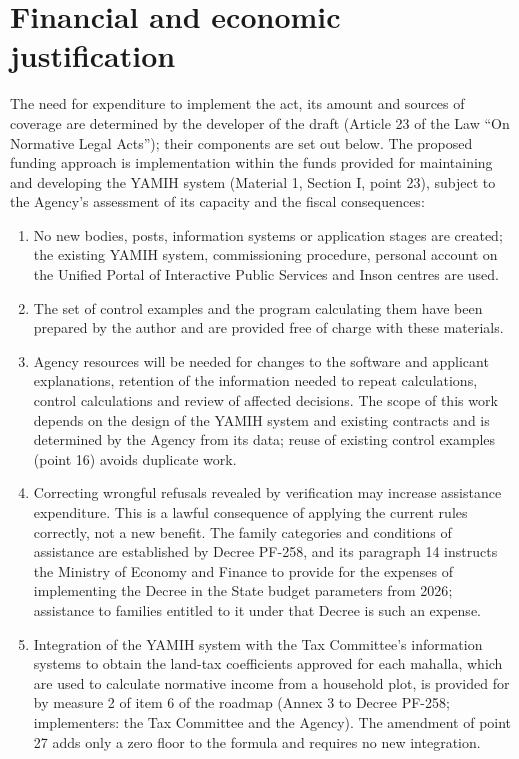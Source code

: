 \documentclass[14pt,a4paper]{extarticle}
\begin{document}
\section{Financial and economic justification}\label{sec:fin}
The need for expenditure to implement the act, its amount and sources of coverage are determined by the developer of the draft (Article 23 of the Law “On Normative Legal Acts”\cite{orq682}); their components are set out below. The proposed funding approach is implementation within the funds provided for maintaining and developing the YAMIH system (Material 1, Section I, point 23), subject to the Agency’s assessment of its capacity and the fiscal consequences:
\begin{enumerate}[leftmargin=1.27cm]
\item No new bodies, posts, information systems or application stages are created; the existing YAMIH system, commissioning procedure, personal account on the Unified Portal of Interactive Public Services and Inson centres are used.
\item The set of control examples and the program calculating them have been prepared by the author and are provided free of charge with these materials.
\item Agency resources will be needed for changes to the software and applicant explanations, retention of the information needed to repeat calculations, control calculations and review of affected decisions. The scope of this work depends on the design of the YAMIH system and existing contracts and is determined by the Agency from its data; reuse of existing control examples (point 16) avoids duplicate work.
\item Correcting wrongful refusals revealed by verification may increase assistance expenditure. This is a lawful consequence of applying the current rules correctly, not a new benefit. The family categories and conditions of assistance are established by Decree PF-258, and its paragraph 14 instructs the Ministry of Economy and Finance to provide for the expenses of implementing the Decree in the State budget parameters from 2026\cite{pf258}; assistance to families entitled to it under that Decree is such an expense.
\item Integration of the YAMIH system with the Tax Committee’s information systems to obtain the land-tax coefficients approved for each mahalla, which are used to calculate normative income from a household plot, is provided for by measure 2 of item 6 of the roadmap (Annex 3 to Decree PF-258; implementers: the Tax Committee and the Agency)\cite{pf258}. The amendment of point 27 adds only a zero floor to the formula and requires no new integration.

\end{enumerate}
\end{document}

